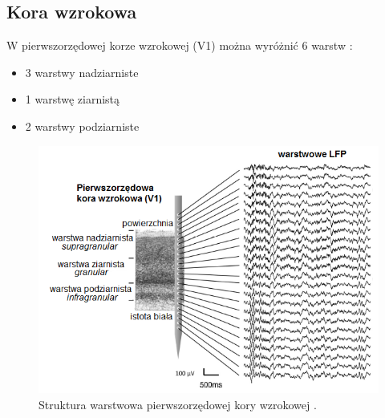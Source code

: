\documentclass{pracamgr_2}
\begin{document}
\subsection{Kora wzrokowa}
W pierwszorzędowej korze wzrokowej (V1) można wyróżnić 6 warstw \citep{kora_warstwy}:
\begin{itemize}
	\item 3 warstwy nadziarniste
	\item 1 warstwę ziarnistą
	\item 2 warstwy podziarniste
\end{itemize}
\begin{figure}[htbp]
	\begin{center}
		\includegraphics[scale=0.55]{warstwy.png}
	\end{center}
	\caption{Struktura warstwowa pierwszorzędowej kory wzrokowej \citep{kora_warstwy}.}
	\label{rys:warstwy}
\end{figure}
\FloatBarrier
\end{document}
